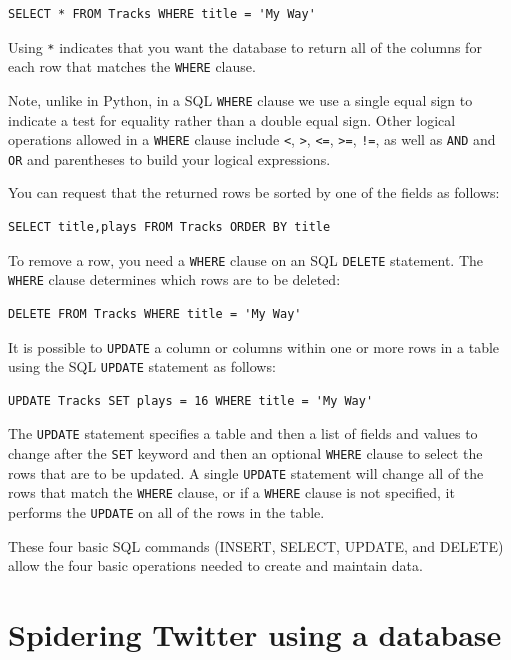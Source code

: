 \documentclass[10pt]{book}
\begin{document}
\beforeverb
\begin{verbatim}
SELECT * FROM Tracks WHERE title = 'My Way'
\end{verbatim}
\afterverb
%
Using \verb"*" indicates that you want the database to return all of 
the columns for each row that matches the {\tt WHERE} clause.  

Note, unlike in Python, in a SQL {\tt WHERE} clause 
we use a single equal sign 
to indicate a test for equality rather than a double equal sign.
Other logical operations allowed in a {\tt WHERE} clause include 
\verb"<",
\verb">",
\verb"<=",
\verb">=",
\verb"!=",
as well as {\tt AND} and {\tt OR} and parentheses
to build your logical expressions.

You can request that the returned rows be sorted by one of 
the fields as follows:

\beforeverb
\begin{verbatim}
SELECT title,plays FROM Tracks ORDER BY title
\end{verbatim}
\afterverb
%
To remove a row, you need a {\tt WHERE} clause on an SQL {\tt DELETE}
statement.  The {\tt WHERE} clause determines which rows are to be deleted:

\beforeverb
\begin{verbatim}
DELETE FROM Tracks WHERE title = 'My Way'
\end{verbatim}
\afterverb
%
It is possible to {\tt UPDATE} a column or columns within one or more rows
in a table using the SQL {\tt UPDATE} statement as follows:

\beforeverb
\begin{verbatim}
UPDATE Tracks SET plays = 16 WHERE title = 'My Way'
\end{verbatim}
\afterverb
%
The {\tt UPDATE} statement specifies a table and 
then a list of fields and values to change after the {\tt SET} 
keyword and then an optional {\tt WHERE} clause to select
the rows that are to be updated.  A single {\tt UPDATE} statement
will change all of the rows that match the {\tt WHERE} clause, or if 
a {\tt WHERE} clause is not specified, it performs the {\tt UPDATE}
on all of the rows in the table.

These four basic SQL commands (INSERT, SELECT, UPDATE, and DELETE) allow 
the four basic operations needed to create and maintain data.


\section{Spidering Twitter using a database}
\end{document}
